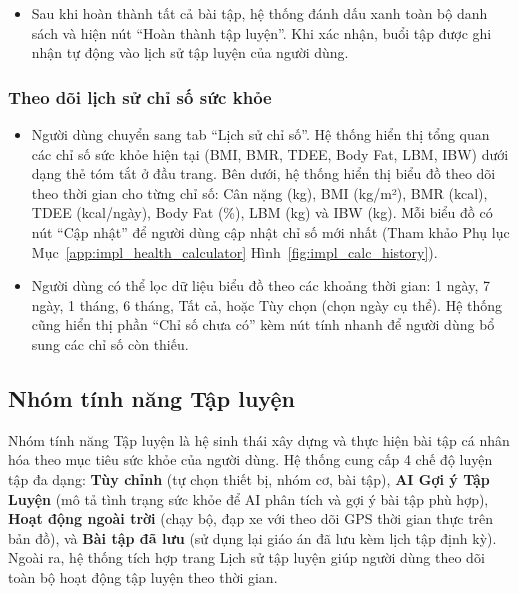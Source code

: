 \begin{itemize}
    \item Sau khi hoàn thành tất cả bài tập, hệ thống đánh dấu xanh toàn bộ danh sách và hiện nút ``Hoàn thành tập luyện''. Khi xác nhận, buổi tập được ghi nhận tự động vào lịch sử tập luyện của người dùng.

\end{itemize}

\subsubsection{Theo dõi lịch sử chỉ số sức khỏe}

\begin{itemize}
    \item Người dùng chuyển sang tab ``Lịch sử chỉ số''. Hệ thống hiển thị tổng quan các chỉ số sức khỏe hiện tại (BMI, BMR, TDEE, Body Fat, LBM, IBW) dưới dạng thẻ tóm tắt ở đầu trang. Bên dưới, hệ thống hiển thị biểu đồ theo dõi theo thời gian cho từng chỉ số: Cân nặng (kg), BMI (kg/m²), BMR (kcal), TDEE (kcal/ngày), Body Fat (\%), LBM (kg) và IBW (kg). Mỗi biểu đồ có nút ``Cập nhật'' để người dùng cập nhật chỉ số mới nhất (Tham khảo Phụ lục Mục~\ref{app:impl_health_calculator} Hình~\ref{fig:impl_calc_history}).

    \item Người dùng có thể lọc dữ liệu biểu đồ theo các khoảng thời gian: 1 ngày, 7 ngày, 1 tháng, 6 tháng, Tất cả, hoặc Tùy chọn (chọn ngày cụ thể). Hệ thống cũng hiển thị phần ``Chỉ số chưa có'' kèm nút tính nhanh để người dùng bổ sung các chỉ số còn thiếu.

\end{itemize}

\subsection{Nhóm tính năng Tập luyện}
\label{subsec:impl_training}

Nhóm tính năng Tập luyện là hệ sinh thái xây dựng và thực hiện bài tập cá nhân hóa theo mục tiêu sức khỏe của người dùng. Hệ thống cung cấp 4 chế độ luyện tập đa dạng: \textbf{Tùy chỉnh} (tự chọn thiết bị, nhóm cơ, bài tập), \textbf{AI Gợi ý Tập Luyện} (mô tả tình trạng sức khỏe để AI phân tích và gợi ý bài tập phù hợp), \textbf{Hoạt động ngoài trời} (chạy bộ, đạp xe với theo dõi GPS thời gian thực trên bản đồ), và \textbf{Bài tập đã lưu} (sử dụng lại giáo án đã lưu kèm lịch tập định kỳ). Ngoài ra, hệ thống tích hợp trang Lịch sử tập luyện giúp người dùng theo dõi toàn bộ hoạt động tập luyện theo thời gian.

